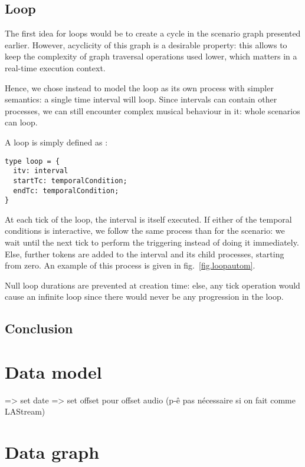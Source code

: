 \documentclass{article}
\begin{document}
\subsection{Loop}\label{sec.loop}
The first idea for loops would be to create a cycle in the scenario graph presented earlier.
However, acyclicity of this graph is a desirable property: this allows to keep the complexity of graph traversal operations used lower,
which matters in a real-time execution context.

Hence, we chose instead to model the loop as its own process with simpler semantics: 
a single time interval will loop. Since intervals can contain other processes, we can still encounter complex musical behaviour in it:
whole scenarios can loop.

A loop is simply defined as : 
\begin{lstlisting}
type loop = {
  itv: interval
  startTc: temporalCondition; 
  endTc: temporalCondition;
}
\end{lstlisting}

At each tick of the loop, the interval is itself executed.
If either of the temporal conditions is interactive, we follow the same process than for the scenario: 
we wait until the next tick to perform the triggering instead of doing it immediately. 
Else, further tokens are added to the interval and its child processes, starting from zero.
An example of this process is given in fig.~\ref{fig.loopautom}.

Null loop durations are prevented at creation time: else, any tick operation would cause an infinite loop since there 
would never be any progression in the loop.

\subsection{Conclusion}

\section{Data model}\label{sec.datamodel}
=> set date
=> set offset pour offset audio (p-ê pas nécessaire si on fait comme LAStream)

\section{Data graph}
\end{document}
